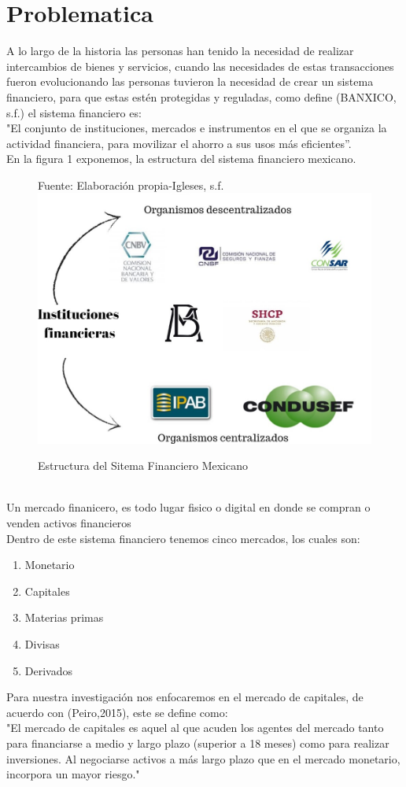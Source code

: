 \documentclass[12pt,a4paper]{article}
\begin{document}
		\section{Problematica}
		A lo largo de la historia las personas han tenido la necesidad de realizar intercambios de bienes y servicios, cuando las necesidades de estas transacciones fueron evolucionando  las personas tuvieron la necesidad de crear un sistema financiero, para que estas estén protegidas y reguladas, como  define (BANXICO, s.f.) el sistema financiero es:\\ 
\hspace{5mm}"El conjunto de instituciones, mercados e instrumentos en el que se organiza la actividad financiera, para movilizar el ahorro a sus usos más eficientes”.\\
En la figura 1 exponemos, la estructura del sistema financiero mexicano.\\
\begin{figure}[htb]
	\centering
	\caption{Estructura del Sitema Financiero Mexicano}{{\footnotesize Fuente: Elaboración propia-Igleses, s.f.}}
	\includegraphics[scale=0.4]{estructurasfm.jpg}
\end{figure}\\
Un mercado finanicero, es todo lugar fisico o digital en donde se compran o venden activos financieros\\
Dentro de este sistema financiero tenemos cinco mercados, los cuales son:
\begin{enumerate}
\item Monetario
\item Capitales
\item Materias primas
\item Divisas
\item Derivados
\end{enumerate}
Para nuestra investigación nos enfocaremos en el mercado de capitales, de acuerdo con (Peiro,2015), este se define como:\\
"El mercado de capitales es aquel al que acuden los agentes del mercado tanto para financiarse a medio y largo plazo (superior a 18 meses) como para realizar inversiones. Al negociarse activos a más largo plazo que en el mercado monetario, incorpora un mayor riesgo."\\
\end{document}
